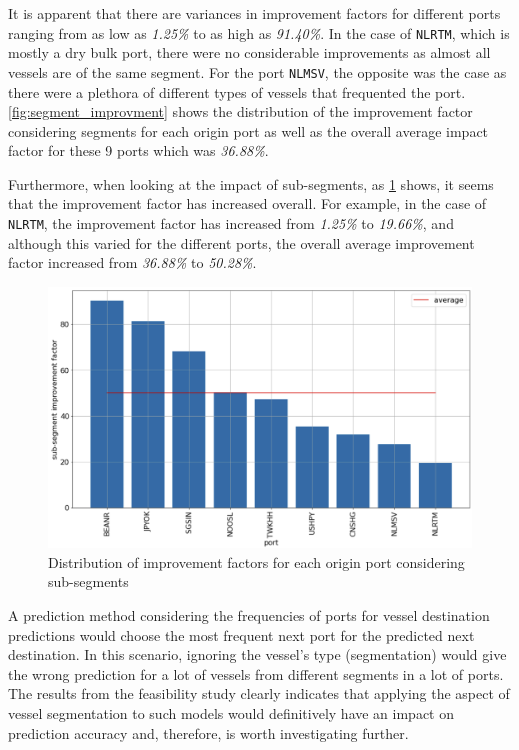 It is apparent that there are variances in improvement factors for different ports ranging from as low as \textit{1.25\%} to as high as \textit{91.40\%}. In the case of \texttt{NLRTM}, which is mostly a dry bulk port, there were no considerable improvements as almost all vessels are of the same segment. For the port \texttt{NLMSV}, the opposite was the case as there were a plethora of different types of vessels that frequented the port. \cref{fig:segment_improvment} shows the distribution of the improvement factor considering segments for each origin port as well as the overall average impact factor for these 9 ports which was \textit{36.88\%}.

Furthermore, when looking at the impact of sub-segments, as \cref{fig:subsegment_improvment} shows, it seems that the improvement factor has increased overall. For example, in the case of \texttt{NLRTM}, the improvement factor has increased from \textit{1.25\%} to \textit{19.66\%}, and although this varied for the different ports, the overall average improvement factor increased from \textit{36.88\%} to \textit{50.28\%}.

\begin{figure}[htbp]
    \centering
    \includegraphics[width=.9\textwidth]{figures/apw/subsegment_improvement.png}
    \caption{Distribution of improvement factors for each origin port considering sub-segments}
    \label{fig:subsegment_improvment}
\end{figure}

A prediction method considering the frequencies of ports for vessel destination predictions would choose the most frequent next port for the predicted next destination. In this scenario, ignoring the vessel's type (segmentation) would give the wrong prediction for a lot of vessels from different segments in a lot of ports. The results from the feasibility study clearly indicates that applying the aspect of vessel segmentation to such models would definitively have an impact on prediction accuracy and, therefore, is worth investigating further.
